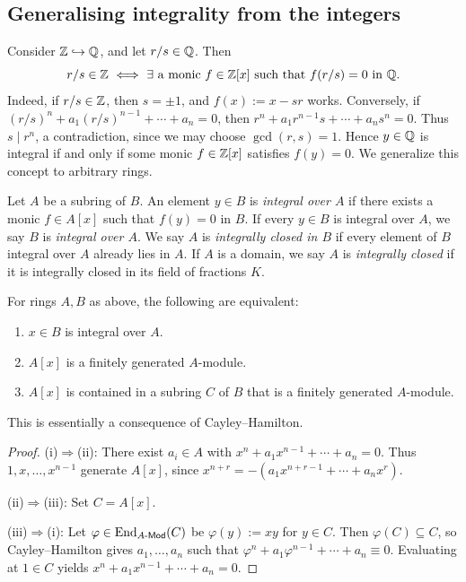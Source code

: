 \documentclass[11pt,a4paper]{article}
\begin{document}
\subsection{Generalising integrality from the integers}
Consider $\mathbb{Z}\hookrightarrow\mathbb{Q}$, and let $r/s\in\mathbb{Q}$. Then
\[
r/s\in\mathbb{Z}\ \Longleftrightarrow\ \exists\text{ a monic }f\in\mathbb{Z}[x]\text{ such that }f(r/s)=0\text{ in }\mathbb{Q}.
\]
Indeed, if $r/s\in\mathbb{Z}$, then $s=\pm1$, and $f(x):=x-sr$ works. Conversely, if $(r/s)^n+a_1(r/s)^{n-1}+\cdots+a_n=0$, then $r^n+a_1r^{n-1}s+\cdots+a_ns^n=0$.
Thus $s\mid r^n$, a contradiction, since we may choose $\gcd(r,s)=1$. Hence $y\in\mathbb{Q}$ is integral if and only if some monic $f\in\mathbb{Z}[x]$ satisfies $f(y)=0$. We generalize this concept to arbitrary rings.
\setcounter{definition}{13}\begin{definition}
Let $A$ be a subring of $B$. An element $y\in B$ is \emph{integral over $A$} if there exists a monic $f\in A[x]$ such that $f(y)=0$ in $B$. If every $y\in B$ is integral over $A$, we say $B$ is \emph{integral over $A$}. We say $A$ is \emph{integrally closed in $B$} if every element of $B$ integral over $A$ already lies in $A$. If $A$ is a domain, we say $A$ is \emph{integrally closed} if it is integrally closed in its field of fractions $K$.
\end{definition}
\setcounter{theorem}{20}\begin{proposition}
For rings $A,B$ as above, the following are equivalent:
\begin{enumerate}[label=(\roman*)]
\setcounter{enumi}{0}\item $x\in B$ is integral over $A$.
\setcounter{enumi}{1}\item $A[x]$ is a finitely generated $A$-module.
\setcounter{enumi}{2}\item $A[x]$ is contained in a subring $C$ of $B$ that is a finitely generated $A$-module.
\end{enumerate}
This is essentially a consequence of Cayley--Hamilton.
\end{proposition}
\begin{proof}
(i)$\Rightarrow$(ii): There exist $a_i\in A$ with $x^n+a_1x^{n-1}+\cdots+a_n=0$. Thus $1,x,\ldots,x^{n-1}$ generate $A[x]$, since $x^{n+r}=-(a_1x^{n+r-1}+\cdots+a_nx^r)$.

(ii)$\Rightarrow$(iii): Set $C=A[x]$.

(iii)$\Rightarrow$(i): Let $\varphi\in\operatorname{End}_{A\text{-}\mathsf{Mod}}(C)$ be $\varphi(y):=xy$ for $y\in C$. Then $\varphi(C)\subseteq C$, so Cayley--Hamilton gives $a_1,\ldots,a_n$ such that $\varphi^n+a_1\varphi^{n-1}+\cdots+a_n\equiv0$. Evaluating at $1\in C$ yields
$x^n+a_1x^{n-1}+\cdots+a_n=0$.
\end{proof}
\end{document}
